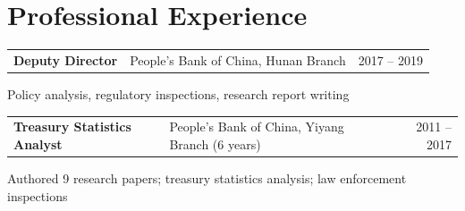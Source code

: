 \section{Professional Experience}

\begin{tabularx}{\linewidth}{@{}l X r@{}}
\textbf{Deputy Director} & People's Bank of China, Hunan Branch & 2017 -- 2019 \\
\end{tabularx}
Policy analysis, regulatory inspections, research report writing

\vspace{3pt}

\begin{tabularx}{\linewidth}{@{}l X r@{}}
\textbf{Treasury Statistics Analyst} & People's Bank of China, Yiyang Branch (6 years) & 2011 -- 2017 \\
\end{tabularx}
Authored 9 research papers; treasury statistics analysis; law enforcement inspections
